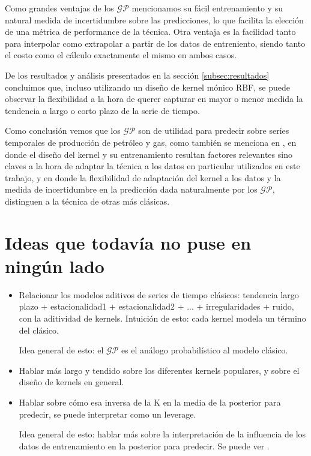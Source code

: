 \documentclass[a4paper]{article}
\newcommand{\gp}{\ensuremath{\mathcal{GP}}}
\begin{document}
Como grandes ventajas de los $\gp$ mencionamos su fácil entrenamiento y su natural medida de incertidumbre sobre las predicciones, lo que facilita la elección de una métrica de performance de la técnica. Otra ventaja es la facilidad tanto para interpolar como extrapolar a partir de los datos de entreniento, siendo tanto el costo como el cálculo exactamente el mismo en ambos casos.

De los resultados y análisis presentados en la sección \ref{subsec:resultados} concluimos que, incluso utilizando un diseño de kernel mónico RBF, se puede observar la flexibilidad a la hora de querer capturar en mayor o menor medida la tendencia a largo o corto plazo de la serie de tiempo.

Como conclusión vemos que los $\gp$ son de utilidad para predecir sobre series temporales de producción de petróleo y gas, como también se menciona en \cite{gppaper1}, en donde el diseño del kernel y su entrenamiento resultan factores relevantes sino claves a la hora de adaptar la técnica a los datos en particular utilizados en este trabajo, y en donde la flexibilidad de adaptación del kernel a los datos y la medida de incertidumbre en la predicción dada naturalmente por los $\gp$, distinguen a la técnica de otras más clásicas.



\section*{Ideas que todavía no puse en ningún lado}
\begin{itemize}
	\item Relacionar los modelos aditivos de series de tiempo clásicos: tendencia largo plazo + estacionalidad1 + estacionalidad2 + ... + irregularidades + ruido, con la aditividad de kernels. Intuición de esto: cada kernel modela un término del clásico.
	
	Idea general de esto: el $\gp$ es el análogo probabilístico al modelo clásico.
	
	\item Hablar más largo y tendido sobre los diferentes kernels populares, y sobre el diseño de kernels en general.
	
	\item Hablar sobre cómo esa inversa de la K en la media de la posterior para predecir, se puede interpretar como un leverage.
	
	Idea general de esto: hablar más sobre la interpretación de la influencia de los datos de entrenamiento en la posterior para predecir. Se puede ver \cite{tesisduvenaud}.
\end{itemize}
\end{document}
